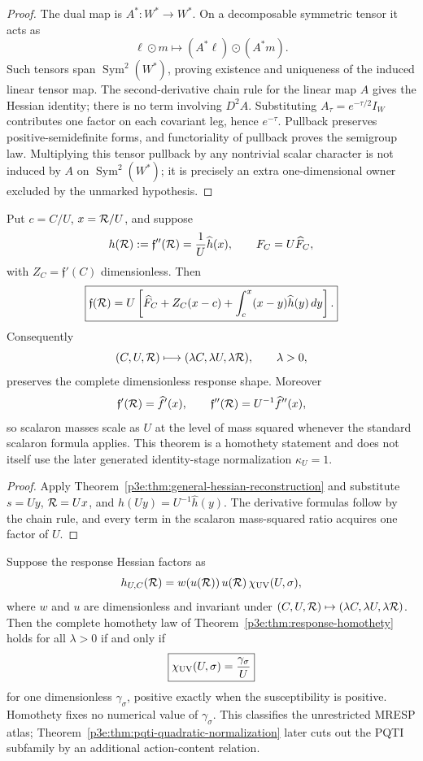 \documentclass[12pt,a4paper]{article}
\begin{document}
\begin{proof}
The dual map is \(A^*:W^*\to W^*\).  On a decomposable symmetric tensor it
acts as
\[
 \ell\odot m\longmapsto(A^*\ell)\odot(A^*m).
\]
Such tensors span \(\operatorname{Sym}^2(W^*)\), proving existence and
uniqueness of the induced linear tensor map.  The second-derivative chain rule
for the linear map \(A\) gives the Hessian identity; there is no term involving
\(D^2A\).  Substituting \(A_\tau=e^{-\tau/2}I_W\) contributes one factor on
each covariant leg, hence \(e^{-\tau}\).  Pullback preserves
positive-semidefinite forms, and functoriality of pullback proves the semigroup
law.  Multiplying this tensor pullback by any nontrivial scalar character is
not induced by \(A\) on \(\operatorname{Sym}^2(W^*)\); it is precisely an
extra one-dimensional owner excluded by the unmarked hypothesis.
\end{proof}

\begin{theorem}
\label{p3e:thm:response-homothety}
Put \(c=C/U\), \(x=\mathcal R/U\), and suppose
\[
 h(\mathcal R):=\mathfrak f''(\mathcal R)
 =\frac1U\widehat h(x),\qquad
 F_C=U\widehat F_C,
\]
with \(Z_C=\mathfrak f'(C)\) dimensionless.  Then
\[
 \boxed{\mathfrak f(\mathcal R)
 =U\left[
 \widehat F_C+Z_C(x-c)
 +\int_c^x(x-y)\widehat h(y)\,dy\right].}
\]
Consequently
\[
 (C,U,\mathcal R)\longmapsto
 (\lambda C,\lambda U,\lambda\mathcal R),\qquad \lambda>0,
\]
preserves the complete dimensionless response shape.  Moreover
\[
 \mathfrak f'(\mathcal R)=\widehat f'(x),\qquad
 \mathfrak f''(\mathcal R)=U^{-1}\widehat f''(x),
\]
so scalaron masses scale as \(U\) at the level of mass squared whenever the
standard scalaron formula applies.  This theorem is a homothety statement and
does not itself use the later generated identity-stage normalization
\(\kappa_U=1\).
\end{theorem}

\begin{proof}
Apply Theorem~\ref{p3e:thm:general-hessian-reconstruction} and substitute
\(s=Uy\), \(\mathcal R=Ux\), and
\(h(Uy)=U^{-1}\widehat h(y)\).  The derivative formulas follow by the chain
rule, and every term in the scalaron mass-squared ratio acquires one factor
of \(U\).
\end{proof}

\begin{corollary}
\label{p3e:cor:uv-susceptibility-homothety}
Suppose the response Hessian factors as
\[
 h_{U,C}(\mathcal R)
 =w(u(\mathcal R))\,u(\mathcal R)\,\chi_{\rm UV}(U,\sigma),
\]
where \(w\) and \(u\) are dimensionless and invariant under
\((C,U,\mathcal R)\mapsto(\lambda C,\lambda U,\lambda\mathcal R)\).  Then the complete
homothety law of Theorem~\ref{p3e:thm:response-homothety} holds for all
\(\lambda>0\) if and only if
\[
 \boxed{\chi_{\rm UV}(U,\sigma)=\frac{\gamma_\sigma}{U}}
\]
for one dimensionless \(\gamma_\sigma\), positive exactly when the
susceptibility is positive.  Homothety fixes no numerical value of
\(\gamma_\sigma\).  This classifies the unrestricted MRESP atlas;
Theorem~\ref{p3e:thm:pqti-quadratic-normalization} later cuts out the PQTI
subfamily by an additional action-content relation.
\end{corollary}
\end{document}
